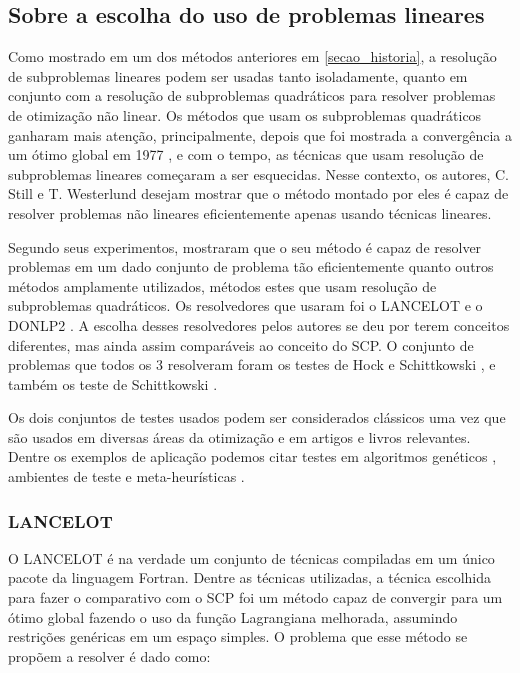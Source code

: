 \subsection{Sobre a escolha do uso de problemas lineares}

\noindent
Como mostrado em um dos métodos anteriores em \ref{secao_historia}, a resolução de subproblemas
lineares podem ser usadas tanto isoladamente, quanto em conjunto com a resolução de subproblemas
quadráticos para resolver problemas de otimização não linear. Os métodos que usam os subproblemas
quadráticos ganharam mais atenção, principalmente, depois que foi mostrada a convergência a um
ótimo global em 1977 \cite{han1977globally}, e com o tempo, as técnicas que usam resolução de
subproblemas lineares começaram a ser esquecidas. Nesse contexto, os autores, C. Still e
T. Westerlund desejam mostrar que o método montado por eles é capaz de resolver problemas não
lineares eficientemente apenas usando técnicas lineares.

Segundo seus experimentos, mostraram que o seu método é capaz de resolver problemas em um dado
conjunto de problema tão eficientemente quanto outros métodos amplamente utilizados, métodos
estes que usam resolução de subproblemas quadráticos. Os resolvedores que usaram foi o LANCELOT
\cite{conn1991globally} e o DONLP2 \cite{spellucci1999donlp2}. A escolha desses resolvedores pelos
autores se deu por terem conceitos diferentes, mas ainda assim comparáveis ao conceito do SCP. O
conjunto de problemas que todos os 3 resolveram foram os testes de Hock e Schittkowski \cite{Hock1981},
e também os teste de Schittkowski \cite{Schittkowski1987}.

Os dois conjuntos de testes usados podem ser considerados clássicos uma vez que são usados em
diversas áreas da otimização e em artigos e livros relevantes. Dentre os exemplos de aplicação
podemos citar testes em algoritmos genéticos \cite{Deb_2000, Joines}, ambientes de teste
\cite{Bongartz_1995} e meta-heurísticas \cite{Gandomi_2012}.

\subsubsection{LANCELOT}
\label{sec_lancelot}

\noindent
O LANCELOT \cite{conn1991globally} é na verdade um conjunto de técnicas compiladas em um único
pacote da  linguagem Fortran. Dentre as técnicas utilizadas, a técnica escolhida para fazer o
comparativo com o SCP foi um método capaz de convergir para um ótimo global fazendo o uso da
função Lagrangiana melhorada, assumindo restrições genéricas em um espaço simples. O problema
que esse método se propõem a resolver é dado como:



